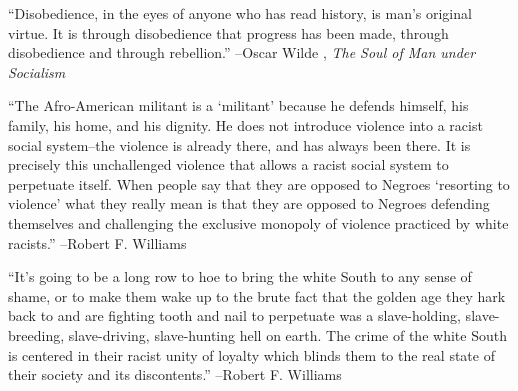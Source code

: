 \documentclass{article}%
\begin{document}
\begin{minipage}{\textwidth}%
\flushleft%
“Disobedience, in the eyes of anyone who has read history, is man's original virtue. It is through disobedience that progress has been made, through disobedience and through rebellion.”%
\linebreak%
\vspace{1mm}%
–Oscar Wilde%
, \textit{The Soul of Man under Socialism}%
\linebreak%
\vspace{1mm}%
\end{minipage}%
\linebreak%
\vspace{1mm}%
\begin{minipage}{\textwidth}%
\flushleft%
“The Afro{-}American militant is a ‘militant’ because he defends himself, his family, his home, and his dignity. He does not introduce violence into a racist social system–the violence is already there, and has always been there. It is precisely this unchallenged violence that allows a racist social system to perpetuate itself. When people say that they are opposed to Negroes ‘resorting to violence’ what they really mean is that they are opposed to Negroes defending themselves and challenging the exclusive monopoly of violence practiced by white racists.”%
\linebreak%
\vspace{1mm}%
–Robert F. Williams%
\linebreak%
\vspace{1mm}%
\end{minipage}%
\linebreak%
\vspace{1mm}%
\begin{minipage}{\textwidth}%
\flushleft%
“It's going to be a long row to hoe to bring the white South to any sense of shame, or to make them wake up to the brute fact that the golden age they hark back to and are fighting tooth and nail to perpetuate was a slave{-}holding, slave{-}breeding, slave{-}driving, slave{-}hunting hell on earth. The crime of the white South is centered in their racist unity of loyalty which blinds them to the real state of their society and its discontents.”%
\linebreak%
\vspace{1mm}%
–Robert F. Williams%
\linebreak%
\vspace{1mm}%
\end{minipage}%
\linebreak%
\end{document}
